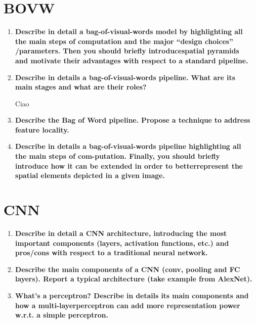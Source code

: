 \documentclass[12pt]{article}
\begin{document}
\section{BOVW}
\begin{enumerate}
    \item \textbf{Describe in detail a bag-of-visual-words model by highlighting all the main steps of computation and the major “design choices” /parameters.
    Then you should briefly introducespatial pyramids and motivate their advantages with respect to a standard pipeline.}

    \item \textbf{Describe in details a bag-of-visual-words pipeline. What are its main stages and what are their roles?}

    Ciao
    \item \textbf{Describe the Bag of Word pipeline. Propose a technique to address feature locality.}
    
    \item \textbf{Describe in details a bag-of-visual-words pipeline highlighting all the main steps of com-putation. 
    Finally, you should briefly introduce how it can be extended in order to betterrepresent the spatial elements depicted in a given image.}

\end{enumerate}

\section{CNN}
\begin{enumerate}
    \item \textbf{Describe in detail a CNN architecture, introducing the most important components (layers, activation functions, etc.)  
    and pros/cons with respect to a traditional neural network.}

    \item \textbf{Describe the main components of a CNN (conv, pooling and FC layers). Report a typical architecture (take example from AlexNet).}
    
    \item \textbf{What’s a perceptron? Describe in details its main components and how a multi-layerperceptron can add more representation power w.r.t. a simple perceptron.}   

\end{enumerate}
\end{document}
